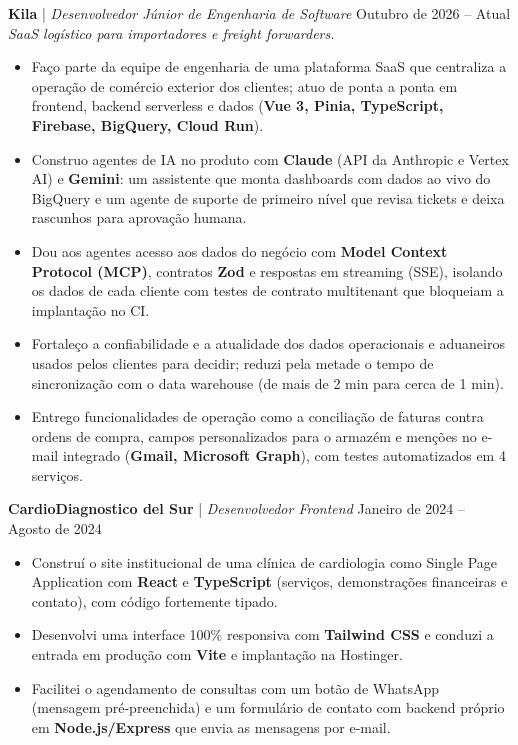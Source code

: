 \documentclass[11pt,a4paper]{article}
\begin{document}
\noindent
\textbf{Kila} | \textit{Desenvolvedor Júnior de Engenharia de Software} \hfill Outubro de 2026 – Atual \\
\textit{SaaS logístico para importadores e freight forwarders.}
\begin{itemize}[leftmargin=*, noitemsep, topsep=2pt]
    \item Faço parte da equipe de engenharia de uma plataforma SaaS que centraliza a operação de comércio exterior dos clientes; atuo de ponta a ponta em frontend, backend serverless e dados (\textbf{Vue 3, Pinia, TypeScript, Firebase, BigQuery, Cloud Run}).
    \item Construo agentes de IA no produto com \textbf{Claude} (API da Anthropic e Vertex AI) e \textbf{Gemini}: um assistente que monta dashboards com dados ao vivo do BigQuery e um agente de suporte de primeiro nível que revisa tickets e deixa rascunhos para aprovação humana.
    \item Dou aos agentes acesso aos dados do negócio com \textbf{Model Context Protocol (MCP)}, contratos \textbf{Zod} e respostas em streaming (SSE), isolando os dados de cada cliente com testes de contrato multitenant que bloqueiam a implantação no CI.
    \item Fortaleço a confiabilidade e a atualidade dos dados operacionais e aduaneiros usados pelos clientes para decidir; reduzi pela metade o tempo de sincronização com o data warehouse (de mais de 2 min para cerca de 1 min).
    \item Entrego funcionalidades de operação como a conciliação de faturas contra ordens de compra, campos personalizados para o armazém e menções no e-mail integrado (\textbf{Gmail, Microsoft Graph}), com testes automatizados em 4 serviços.
\end{itemize}

\vspace{0.2cm}

\noindent
\textbf{CardioDiagnostico del Sur} | \textit{Desenvolvedor Frontend} \hfill Janeiro de 2024 – Agosto de 2024
\begin{itemize}[leftmargin=*, noitemsep, topsep=2pt]
    \item Construí o site institucional de uma clínica de cardiologia como Single Page Application com \textbf{React} e \textbf{TypeScript} (serviços, demonstrações financeiras e contato), com código fortemente tipado.
    \item Desenvolvi uma interface 100\% responsiva com \textbf{Tailwind CSS} e conduzi a entrada em produção com \textbf{Vite} e implantação na Hostinger.
    \item Facilitei o agendamento de consultas com um botão de WhatsApp (mensagem pré-preenchida) e um formulário de contato com backend próprio em \textbf{Node.js/Express} que envia as mensagens por e-mail.
\end{itemize}
\end{document}
